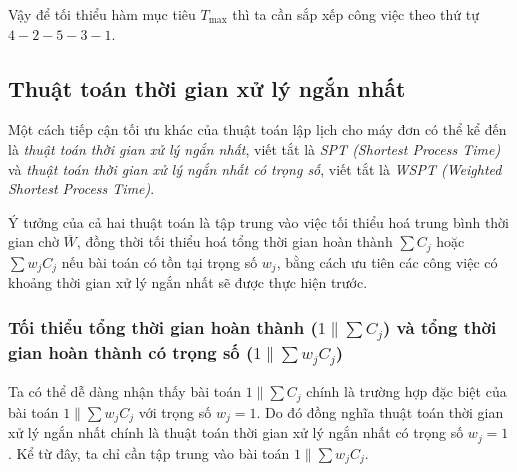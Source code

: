 Vậy để tối thiểu hàm mục tiêu $T_{\max}$ thì ta cần sắp xếp công việc theo thứ tự $4-2-5-3-1$.





























































\subsection{Thuật toán thời gian xử lý ngắn nhất}
Một cách tiếp cận tối ưu khác của thuật toán lập lịch cho máy đơn có thể kể đến là \textit{thuật toán thời gian xử lý ngắn nhất}, viết tắt là \textit{SPT (Shortest Process Time)} và \textit{thuật toán thời gian xử lý ngắn nhất có trọng số}, viết tắt là \textit{WSPT (Weighted Shortest Process Time)}.

Ý tưởng của cả hai thuật toán là tập trung vào việc tối thiểu hoá trung bình thời gian chờ $\overline{W}$, đồng thời tối thiểu hoá tổng thời gian hoàn thành $\sum C_j$ hoặc $\sum w_j C_j$ nếu bài toán có tồn tại trọng số $w_j$, bằng cách ưu tiên các công việc có khoảng thời gian xử lý ngắn nhất sẽ được thực hiện trước. 

\subsubsection*{Tối thiểu tổng thời gian hoàn thành ($1 \| \sum C_j$) và tổng thời gian hoàn thành có trọng số ($1 \| \sum w_j C_j$)}
Ta có thể dễ dàng nhận thấy bài toán $1 \| \sum C_j$ chính là trường hợp đặc biệt của bài toán $1 \| \sum w_j C_j$ với trọng số $w_j=1$. Do đó đồng nghĩa thuật toán thời gian xử lý ngắn nhất chính là thuật toán thời gian xử lý ngắn nhất có trọng số $w_j=1$. Kể từ đây, ta chỉ cần tập trung vào bài toán $1\| \sum w_j C_j$.

